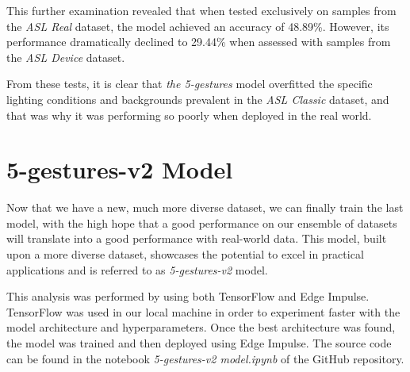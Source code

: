 \documentclass{Configuration_Files/PoliMi3i_thesis}
\begin{document}
This further examination revealed that when tested exclusively on samples from the \textit{ASL Real }dataset, the model achieved an accuracy of 48.89\%. However, its performance dramatically declined to 29.44\% when assessed with samples from the \textit{ASL Device} dataset.

From these tests, it is clear that \textit{the 5-gestures} model overfitted the specific lighting conditions and backgrounds prevalent in the \textit{ASL Classic} dataset, and that was why it was performing so poorly when deployed in the real world.



\chapter{5-gestures-v2 Model }
\label{ch:5-v2-model}%
Now that we have a new, much more diverse dataset, we can finally train the last model, with the high hope that a good performance on our ensemble of datasets will translate into a good performance with real-world data. This model, built upon a more diverse dataset, showcases the potential to excel in practical applications and is referred to as \textit{5-gestures-v2} model. 

This analysis was performed by using both TensorFlow and Edge Impulse. TensorFlow was used in our local machine in order to experiment faster with the model architecture and hyperparameters. Once the best architecture was found, the model was trained and then deployed using Edge Impulse. The source code can be found in the notebook \textit{5-gestures-v2 model.ipynb} of the GitHub repository. 
\end{document}
